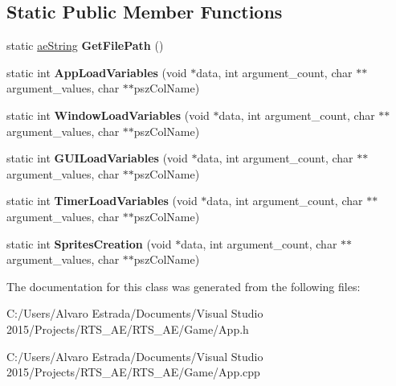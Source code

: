 \subsection*{Static Public Member Functions}
\begin{DoxyCompactItemize}
\item 
static \hyperlink{namespaceae_core_ad6f85aacc0d1fdd85e458e2413e60010}{ae\+String} {\bfseries Get\+File\+Path} ()\hypertarget{classae_app_acd34035805bbad3884140adc0aba8ab1}{}\label{classae_app_acd34035805bbad3884140adc0aba8ab1}

\item 
static int {\bfseries App\+Load\+Variables} (void $\ast$data, int argument\+\_\+count, char $\ast$$\ast$argument\+\_\+values, char $\ast$$\ast$psz\+Col\+Name)\hypertarget{classae_app_a3f46560d28b0fdebd3896458f78fccb0}{}\label{classae_app_a3f46560d28b0fdebd3896458f78fccb0}

\item 
static int {\bfseries Window\+Load\+Variables} (void $\ast$data, int argument\+\_\+count, char $\ast$$\ast$argument\+\_\+values, char $\ast$$\ast$psz\+Col\+Name)\hypertarget{classae_app_a61ef0f02f1c9777b88cb58ef805bab67}{}\label{classae_app_a61ef0f02f1c9777b88cb58ef805bab67}

\item 
static int {\bfseries G\+U\+I\+Load\+Variables} (void $\ast$data, int argument\+\_\+count, char $\ast$$\ast$argument\+\_\+values, char $\ast$$\ast$psz\+Col\+Name)\hypertarget{classae_app_add558af8ee1566519662804c6cc55d33}{}\label{classae_app_add558af8ee1566519662804c6cc55d33}

\item 
static int {\bfseries Timer\+Load\+Variables} (void $\ast$data, int argument\+\_\+count, char $\ast$$\ast$argument\+\_\+values, char $\ast$$\ast$psz\+Col\+Name)\hypertarget{classae_app_a516d0ec1b931513a9949c4d71a47c81d}{}\label{classae_app_a516d0ec1b931513a9949c4d71a47c81d}

\item 
static int {\bfseries Sprites\+Creation} (void $\ast$data, int argument\+\_\+count, char $\ast$$\ast$argument\+\_\+values, char $\ast$$\ast$psz\+Col\+Name)\hypertarget{classae_app_a506664678993d20e64015645a5fd0c9f}{}\label{classae_app_a506664678993d20e64015645a5fd0c9f}

\end{DoxyCompactItemize}


The documentation for this class was generated from the following files\+:\begin{DoxyCompactItemize}
\item 
C\+:/\+Users/\+Alvaro Estrada/\+Documents/\+Visual Studio 2015/\+Projects/\+R\+T\+S\+\_\+\+A\+E/\+R\+T\+S\+\_\+\+A\+E/\+Game/App.\+h\item 
C\+:/\+Users/\+Alvaro Estrada/\+Documents/\+Visual Studio 2015/\+Projects/\+R\+T\+S\+\_\+\+A\+E/\+R\+T\+S\+\_\+\+A\+E/\+Game/App.\+cpp\end{DoxyCompactItemize}
